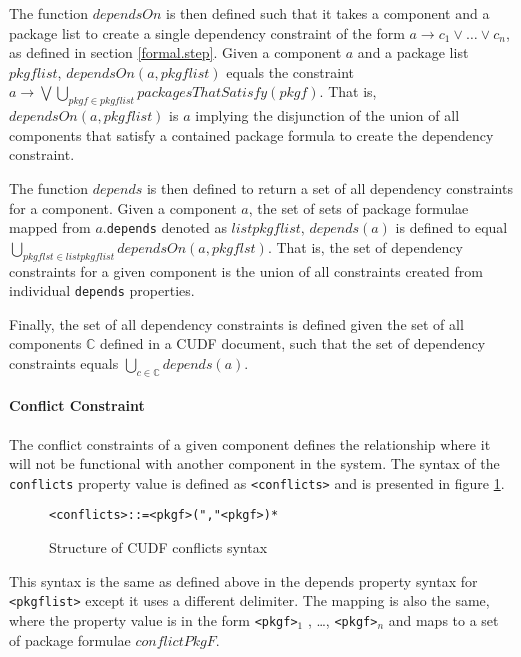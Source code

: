 The function $dependsOn$ is then defined such that it takes a component and a package list to create a single dependency constraint of the form $a \rightarrow c_1 \vee \ldots \vee c_n$,
as defined in section \ref{formal.step}.
Given a component $a$ and a package list $pkgflist$, 
$dependsOn(a,pkgflist)$ equals the constraint $a \rightarrow \bigvee  \bigcup \limits_{pkgf \in pkgflist} packagesThatSatisfy(pkgf)$.
That is, $dependsOn(a,pkgflist)$ is $a$ implying the disjunction of the union of all components that satisfy a contained package formula to create the dependency constraint. 

The function $depends$ is then defined to return a set of all dependency constraints for a component.
Given a component $a$, the set of sets of package formulae mapped from $a$.\verb+depends+ denoted as $listpkgflist$,
$depends(a)$ is defined to equal $\bigcup \limits_{pkgflst \in listpkgflist} dependsOn(a,pkgflst)$.
That is, the set of dependency constraints for a given component is the union of all constraints created from individual \verb+depends+ properties.

Finally, the set of all dependency constraints is defined given the set of all components $\mathbb{C}$ defined in a CUDF document,
such that the set of dependency constraints equals $\bigcup \limits_{c\in \mathbb{C}} depends(a)$.

\paragraph{Conflict Constraint}
The conflict constraints of a given component defines the relationship where it will not be functional with another component in the system.
The syntax of the \verb+conflicts+ property value is defined as \verb+<conflicts>+ and is presented in figure \ref{formal.cudfconflictsyntax}.

\begin{figure}[htp] 
\begin{center}
\begin{alltt}
<conflicts> ::= <pkgf> ("," <pkgf>)*
\end{alltt}
  \caption[CUDF Package conflicts syntax]{Structure of CUDF conflicts syntax}
  \label{formal.cudfconflictsyntax}
\end{center}
\end{figure}

This syntax is the same as defined above in the depends property syntax for \verb+<pkgflist>+ except it uses a different delimiter. 
The mapping is also the same, where the property value is in the form \verb+<pkgf>+$_1$ , \ldots , \verb+<pkgf>+$_n$ and maps to a set of package formulae $conflictPkgF$.


